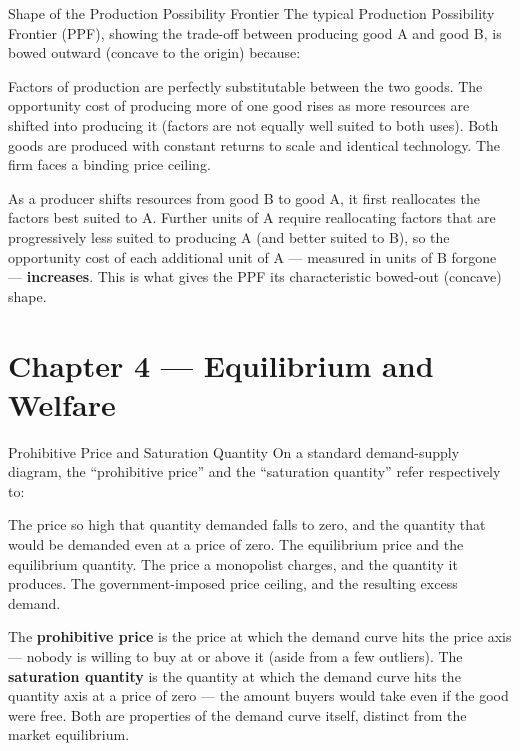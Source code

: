 \begin{question}[type=mc]{Shape of the Production Possibility Frontier}
The typical Production Possibility Frontier (PPF), showing the trade-off
between producing good A and good B, is bowed outward (concave to the
origin) because:
\begin{choices}
  \choice        Factors of production are perfectly substitutable between
                 the two goods.
  \correctchoice The opportunity cost of producing more of one good rises as
                 more resources are shifted into producing it (factors are
                 not equally well suited to both uses).
  \choice        Both goods are produced with constant returns to scale and
                 identical technology.
  \choice        The firm faces a binding price ceiling.
\end{choices}
\begin{solution}
  As a producer shifts resources from good B to good A, it first reallocates
  the factors best suited to A. Further units of A require reallocating
  factors that are progressively less suited to producing A (and better
  suited to B), so the opportunity cost of each additional unit of A —
  measured in units of B forgone — \textbf{increases}. This is what gives
  the PPF its characteristic bowed-out (concave) shape.
\end{solution}
\end{question}


\section{Chapter 4 — Equilibrium and Welfare}

\begin{question}[type=mc]{Prohibitive Price and Saturation Quantity}
On a standard demand-supply diagram, the ``prohibitive price'' and the
``saturation quantity'' refer respectively to:
\begin{choices}
  \correctchoice The price so high that quantity demanded falls to zero, and
                 the quantity that would be demanded even at a price of zero.
  \choice        The equilibrium price and the equilibrium quantity.
  \choice        The price a monopolist charges, and the quantity it produces.
  \choice        The government-imposed price ceiling, and the resulting
                 excess demand.
  
\end{choices}
\begin{solution}
  The \textbf{prohibitive price} is the price at which the demand curve hits
  the price axis — nobody is willing to buy at or above it (aside from a few
  outliers). The \textbf{saturation quantity} is the quantity at which the
  demand curve hits the quantity axis at a price of zero — the amount buyers
  would take even if the good were free. Both are properties of the demand
  curve itself, distinct from the market equilibrium.
\end{solution}
\end{question}


